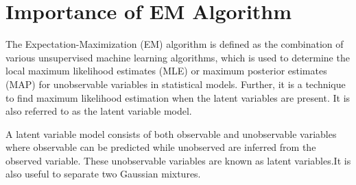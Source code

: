 \section{Importance of EM Algorithm}
The Expectation-Maximization (EM) algorithm is defined as the combination of various unsupervised machine learning algorithms, which is used to determine the local maximum likelihood estimates (MLE) or maximum posterior estimates (MAP) for unobservable variables in statistical models. Further, it is a technique to find maximum likelihood estimation when the latent variables are present. It is also referred to as the latent variable model.

A latent variable model consists of both observable and unobservable variables where observable can be predicted while unobserved are inferred from the observed variable. These unobservable variables are known as latent variables.It is also useful to separate two Gaussian mixtures.
